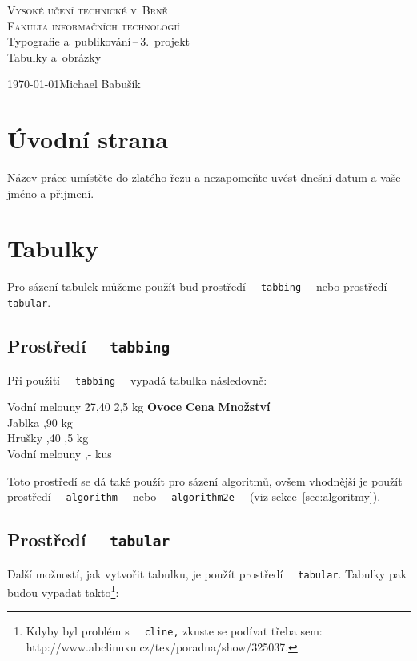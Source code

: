 \documentclass[a4paper, 11pt]{article}
\begin{document}
\begin{titlepage}
    \begin{center}
        \Huge \textsc{Vysoké učení technické v~Brně} \\
        \huge \textsc{Fakulta informačních technologií} \\
        \LARGE{Typografie a~publikování\,--\,3.~projekt} \\
        \Huge{Tabulky a~obrázky}
    \end{center}

    {\Large{\today{\hfill{Michael Babušík}}}}
\end{titlepage}

\section{Úvodní strana}
Název práce umístěte do zlatého řezu a nezapomeňte uvést dnešní datum a vaše jméno a přijmení.

\section{Tabulky}
Pro sázení tabulek můžeme použít buď prostředí \texttt{\,\,tabbing\,\,} nebo prostředí \texttt{\,\,tabular}.

\subsection{Prostředí \texttt{\,\,tabbing}}
Při použití \texttt{\,\,tabbing\,\,} vypadá tabulka následovně:
\begin{tabbing}
    Vodní melouny \quad \= 27,40 \quad \= 2,5 kg \quad \kill
    \textbf{Ovoce} \> \textbf{Cena} \> \textbf{Množství} \\
    Jablka ,90  kg \\
    Hrušky ,40 ,5 kg \\
    Vodní melouny ,-  kus \\
\end{tabbing}
Toto prostředí se dá také použít pro sázení algoritmů, ovšem vhodnější je použít prostředí \texttt{\,\,algorithm\,\,} nebo \texttt{\,\,algorithm2e\,\,} (viz sekce~\ref{sec:algoritmy}).

\subsection{Prostředí \texttt{\,\,tabular}}
Další možností, jak vytvořit tabulku, je použít prostředí \texttt{\,\,tabular}. Tabulky pak budou vypadat takto\footnote{Kdyby byl problém s \texttt{\,\,cline,} zkuste se podívat třeba sem: http://www.abclinuxu.cz/tex/poradna/show/325037.}:
\end{document}
